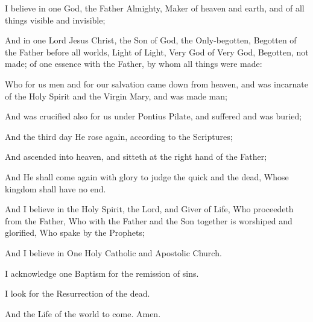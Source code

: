 I believe in one God, the Father Almighty, Maker of heaven and earth, and of all things visible and invisible;

And in one Lord Jesus Christ, the Son of God, the Only-begotten, Begotten of the Father before all worlds, Light of Light, Very God of Very God, Begotten, not made; of one essence with the Father, by whom all things were made:

Who for us men and for our salvation came down from heaven, and was incarnate of the Holy Spirit and the Virgin Mary, and was made man;

And was crucified also for us under Pontius Pilate, and suffered and was buried;

And the third day He rose again, according to the Scriptures;

And ascended into heaven, and sitteth at the right hand of the Father;

And He shall come again with glory to judge the quick and the dead, Whose kingdom shall have no end.

And I believe in the Holy Spirit, the Lord, and Giver of Life, Who proceedeth from the Father, Who with the Father and the Son together is worshiped and glorified, Who spake by the Prophets;

And I believe in One Holy Catholic and Apostolic Church.

I acknowledge one Baptism for the remission of sins.

I look for the Resurrection of the dead.

And the Life of the world to come. Amen.
